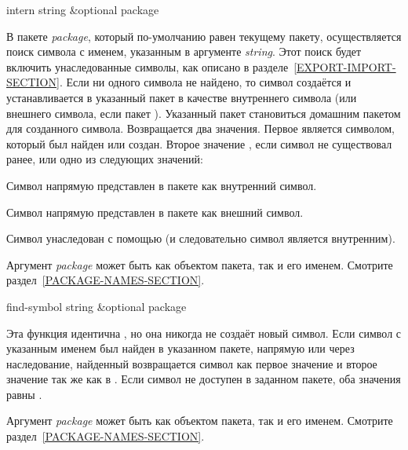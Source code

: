 \begin{defun}[Функция]
intern string &optional package

В пакете \emph{package}, который по-умолчанию равен текущему пакету,
осуществляется поиск символа с именем, указанным в аргументе \emph{string}. Этот
поиск будет включить унаследованные символы, как описано в
разделе~\ref{EXPORT-IMPORT-SECTION}.
Если ни одного символа не найдено, то символ создаётся и устанавливается в
указанный пакет в качестве внутреннего символа (или внешнего символа, если пакет
). Указанный пакет становиться домашним пакетом для созданного символа.
Возвращается два значения. Первое является символом, который был найден или
создан. Второе значение {\false}, если символ не существовал ранее, или одно из
следующих значений:
\begin{indentdesc}{6pc}
\item[\cd{:internal}]
Символ напрямую представлен в пакете как внутренний символ.

\item[\cd{:external}]
Символ напрямую представлен в пакете как внешний символ.

\item[\cd{:inherited}]
Символ унаследован с помощью  (и следовательно символ является
внутренним).
\end{indentdesc}

Аргумент \emph{package} может быть как объектом пакета, так и его
именем. Смотрите раздел~\ref{PACKAGE-NAMES-SECTION}.
\end{defun}

\begin{defun}[Функция]
find-symbol string &optional package

Эта функция идентична , но она никогда не создаёт новый символ. Если
символ с указанным именем был найден в указанном пакете, напрямую или через
наследование, найденный возвращается символ как первое значение и второе
значение так же как в . Если символ не доступен в заданном пакете,
оба значения равны {\false}.

Аргумент \emph{package} может быть как объектом пакета, так и его
именем. Смотрите раздел~\ref{PACKAGE-NAMES-SECTION}.
\end{defun}

